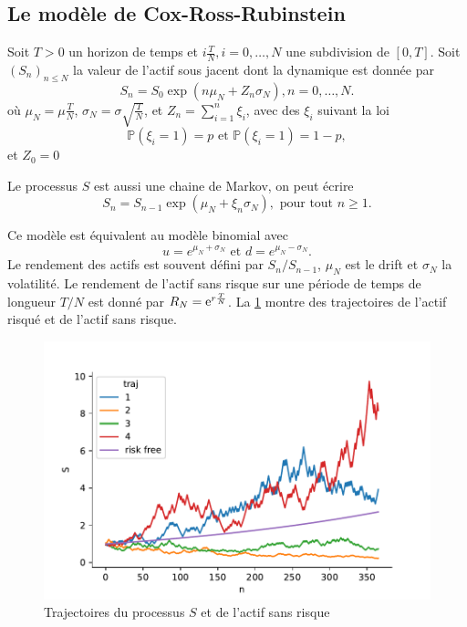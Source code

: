 \subsection{Le modèle de Cox-Ross-Rubinstein}
Soit $T>0$ un horizon de temps et $i\frac{T}{N}, i = 0,\ldots,N$ une subdivision de $[0, T]$. Soit $(S_n)_{n\leq N}$ la valeur de l'actif sous jacent dont la dynamique est donnée par 
$$
S_n = S_0\exp(n\mu_N + Z_n\sigma_N), n = 0,\ldots, N. 
$$
où $\mu_N = \mu\frac{T}{N}$, $\sigma_N = \sigma\sqrt{\frac{T}{N}}$, et $Z_n = \sum_{i = 1}^n\xi_i$, avec des $\xi_i$ \iid suivant la loi
$$
\mathbb{P}(\xi_i=1) = p\text{ et }\mathbb{P}(\xi_i=1) = 1-p,
$$
et $Z_0 = 0$
\begin{remark}
\begin{enumerate}
    Le processus $S$ est aussi une chaine de Markov, on peut écrire 
    $$
    S_n = S_{n-1}\exp(\mu_N + \xi_{n}\sigma_N),\text{ pour tout }n\geq1.
    $$
\end{enumerate}

\end{remark}
Ce modèle est équivalent au modèle binomial avec
$$
u = e^{\mu_N + \sigma_N}\text{ et }d = e^{\mu_N - \sigma_N}.
$$
Le rendement des actifs est souvent défini par $S_n / S_{n-1}$, $\mu_N$ est le drift et $\sigma_N$ la volatilité. Le rendement de l'actif sans risque sur une période de temps de longueur $T/N$ est donné par $R_N  = \mathrm{e}^{r\frac{T}{N}}$. La \cref{fig:traj_CRR} montre des trajectoires de l'actif risqué et de l'actif sans risque.
\begin{figure}
\centering
\includegraphics[width = \textwidth]{../Figures/traj_CRR.pdf}
\caption{Trajectoires du processus $S$ et de l'actif sans risque}
\label{fig:traj_CRR}
\end{figure}

